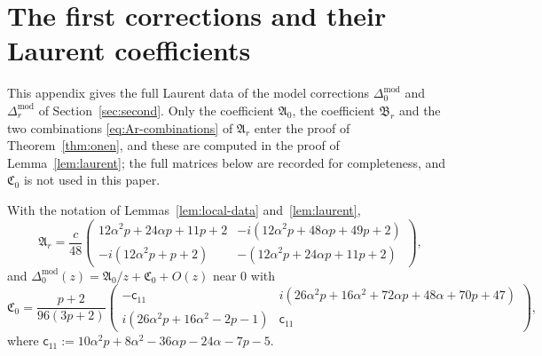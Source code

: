 
\section{The first corrections and their Laurent coefficients}\label{app:residues}

This appendix gives the full Laurent data of the model corrections $\Delta_0^{\mathrm{mod}}$ and $\Delta_r^{\mathrm{mod}}$ of
Section~\ref{sec:second}. Only the coefficient $\mathfrak A_0$, the coefficient $\mathfrak B_r$ and the two combinations
\eqref{eq:Ar-combinations} of $\mathfrak A_r$ enter the proof of Theorem~\ref{thm:onen}, and these are computed in the proof
of Lemma~\ref{lem:laurent}; the full matrices below are recorded for completeness, and $\mathfrak C_0$ is not used in this
paper.

\begin{lemma}\label{lem:residues-full}
With the notation of Lemmas~\ref{lem:local-data} and~\ref{lem:laurent},
\[
  \mathfrak A_r=\frac c{48}\begin{pmatrix}12\alpha^2p+24\alpha p+11p+2&-i(12\alpha^2p+48\alpha p+49p+2)\\
  -i(12\alpha^2p+p+2)&-(12\alpha^2p+24\alpha p+11p+2)\end{pmatrix},
\]
and $\Delta_0^{\mathrm{mod}}(z)=\mathfrak A_0/z+\mathfrak C_0+O(z)$ near $0$ with
\[
  \mathfrak C_0=\frac{p+2}{96(3p+2)}\begin{pmatrix}-\mathsf c_{11}&i(26\alpha^2p+16\alpha^2+72\alpha p+48\alpha+70p+47)\\
  i(26\alpha^2p+16\alpha^2-2p-1)&\mathsf c_{11}\end{pmatrix},
\]
where $\mathsf c_{11}:=10\alpha^2p+8\alpha^2-36\alpha p-24\alpha-7p-5$.
\end{lemma}

